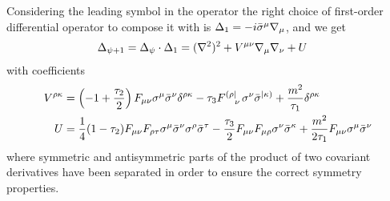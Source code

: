 Considering  the leading symbol in the operator the right choice of first-order differential operator to compose it with is \( \Delta_1 = - i \bar \sigma^\mu { \mathcal{\nabla} }_\mu \), and we get
\begin{equation}
\begin{split}
\Delta_{\psi+1} 
	& =
\Delta_\psi \cdot \Delta_1
	=
({ \mathcal{\nabla} }^2)^2
+ 
V^{\mu\nu} { \mathcal{\nabla} }_{\mu} { \mathcal{\nabla} }_{\nu}
+ U
\end{split}
\end{equation}
with coefficients
\begin{align}
V^{\rho \kappa} & =
	\left(-1 + \frac{\tau_2}{2}\right) 
	F_{\mu\nu} \sigma^{\mu} \bar \sigma^\nu \delta^{\rho\kappa}
	- \tau_3 F\indices{^{(\rho|}_\nu }\sigma^\nu \bar\sigma^{|\kappa)}
	+ \frac{m^2}{\tau_{1}} \delta^{ \rho \kappa }
	\\
U & =
\frac{1}{4} (1 - \tau_2) F_{\mu\nu} F_{\rho \tau} \sigma^\mu \bar \sigma^\nu \sigma^\rho \bar \sigma^\tau
-  \frac{\tau_3}{2} F_{\mu\nu} F_{\mu\rho} \sigma^\nu \bar \sigma^\kappa
+ \frac{m^2}{2 \tau_{1}} F_{\mu\nu} \sigma^\mu \bar \sigma^\nu
\end{align}
where symmetric and antisymmetric parts of the product of two covariant derivatives have been separated in order to ensure the correct symmetry properties.

